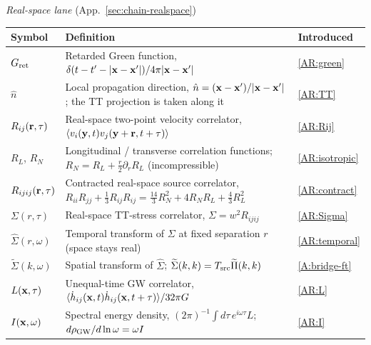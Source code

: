 \documentclass[10pt,prd,aps,nobibnotes,superscriptaddress,preprintnumbers,notitlepage]{revtex4-1}
\def \pa{\partial}
\newcommand{\n}{\hat{n}}
\newcommand{\xb}{{\bf x}}
\newcommand{\br}{{\bf r}}
\begin{document}
\medskip\noindent \emph{Real-space lane} (App.~\ref{sec:chain-realspace})\par\nobreak\smallskip
\noindent\begin{tabular}{@{}p{} p{} p{}@{}}
\hline\hline
Symbol & Definition & Introduced \\
\hline
$G_{\rm ret}$          & Retarded Green function, $\delta(t-t'-|\xb-\xb'|)/4\pi|\xb-\xb'|$ & \eqref{AR:green}\\
$\n$                   & Local propagation direction, $\n=(\xb-\xb')/|\xb-\xb'|$; the TT projection is taken along it & \eqref{AR:TT}\\
$R_{ij}(\br,\tau)$     & Real-space two-point velocity correlator, $\langle v_i(\mathbf{y},t)v_j(\mathbf{y}+\br,t+\tau)\rangle$ & \eqref{AR:Rij}\\
$R_L$, $R_N$           & Longitudinal / transverse correlation functions; $R_N=R_L+\tfrac r2\pa_rR_L$ (incompressible) & \eqref{AR:isotropic}\\
$R_{ijij}(\br,\tau)$   & Contracted real-space source correlator, $R_{ii}R_{jj}+\tfrac13R_{ij}R_{ij}=\tfrac{14}{3}R_N^2+4R_NR_L+\tfrac43R_L^2$ & \eqref{AR:contract}\\
$\Sigma(r,\tau)$       & Real-space TT-stress correlator, $\Sigma=w^2R_{ijij}$ & \eqref{AR:Sigma}\\
$\widehat\Sigma(r,\omega)$ & Temporal transform of $\Sigma$ at fixed separation $r$ (space stays real) & \eqref{AR:temporal}\\
$\widetilde\Sigma(k,\omega)$ & Spatial transform of $\widehat\Sigma$; $\widetilde\Sigma(k,k)=T_{\rm src}\widetilde\Pi(k,k)$ & \eqref{A:bridge-ft}\\
$L(\xb,\tau)$          & Unequal-time GW correlator, $\langle\dot h_{ij}(\xb,t)\dot h_{ij}(\xb,t+\tau)\rangle/32\pi G$ & \eqref{AR:L}\\
$I(\xb,\omega)$        & Spectral energy density, $(2\pi)^{-1}\!\int\!d\tau\,e^{i\omega\tau}L$; $d\rho_{\rm GW}/d\ln\omega=\omega I$ & \eqref{AR:I}\\
\hline\hline
\end{tabular}\par
\end{document}
